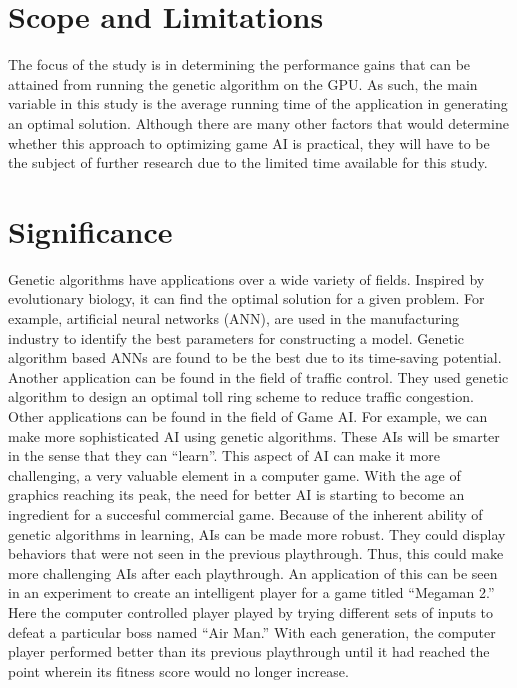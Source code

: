 \section{Scope and Limitations}

The focus of the study is in determining the performance gains that can be attained from
running the genetic algorithm on the GPU. As such, the main variable in this study is the
average running time of the application in generating an optimal solution. Although there
are many other factors that would determine whether this approach to optimizing game AI
is practical, they will have to be the subject of further research due to the limited time
available for this study.


\section{Significance}

Genetic algorithms have applications over a wide variety of fields.
Inspired by evolutionary biology, it can find the optimal solution
for a given problem. For example, artificial neural networks (ANN),
are used in the manufacturing industry to identify the best parameters
for constructing a model. Genetic algorithm based ANNs are found to be
the best due to its time-saving potential\cite{Venkatesan08}. Another
application can be found in the field of traffic control. They used
genetic algorithm to design an optimal toll ring scheme to reduce traffic
congestion\cite{Sumalee08}. Other applications can be found in the field
of Game AI. For example, we can make more sophisticated AI using genetic
algorithms. These AIs will be smarter in the sense that they can ``learn''.
This aspect of AI can make it more challenging, a very valuable element
in a computer game. With the age of graphics reaching its peak, the need
for better AI is starting to become an ingredient for a succesful
commercial game\cite{Yue06}. Because of the inherent ability of genetic
algorithms in learning, AIs can be made more robust. They could display
behaviors that were not seen in the previous playthrough. Thus, this
could make more challenging AIs after each playthrough. An application
of this can be seen in an experiment to create an intelligent player
for a game titled ``Megaman 2.'' Here the
computer controlled player played by trying different sets of inputs
to defeat a particular boss named ``Air Man.'' With each generation,
the computer player performed better than its previous playthrough
until it had reached the point wherein its fitness score would no longer
increase\cite{website:Kuliniewicz09}.


